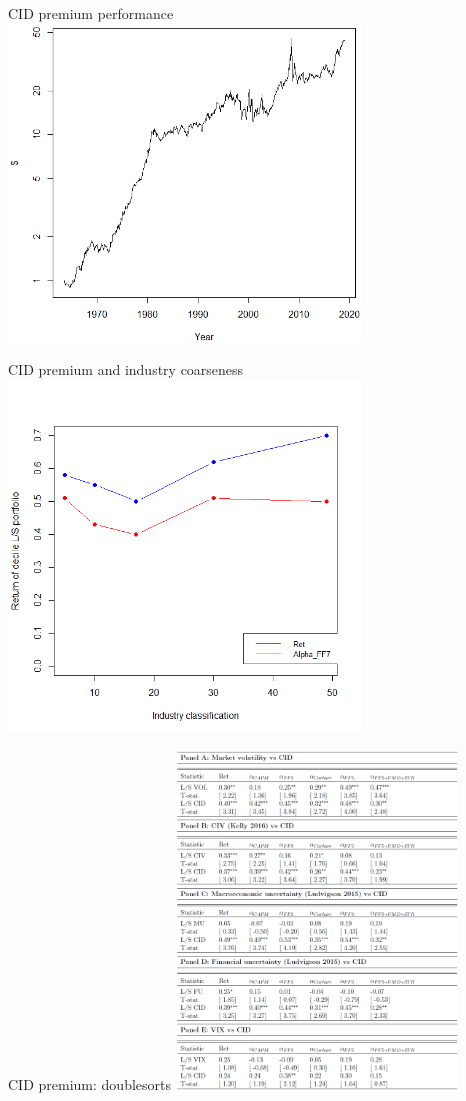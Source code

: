 \documentclass{beamer}
\begin{document}
\begin{frame}{CID premium performance}
\includegraphics[width=0.70\textwidth]{Figure3.png}
\end{frame}




\begin{frame}{CID premium and industry coarseness}
\includegraphics[width=0.70\textwidth]{alphas_inds.png}
\end{frame}



\begin{frame}{CID premium: doublesorts}
\includegraphics[width=0.56\textwidth]{doublesorts.png}
\end{frame}
\end{document}

